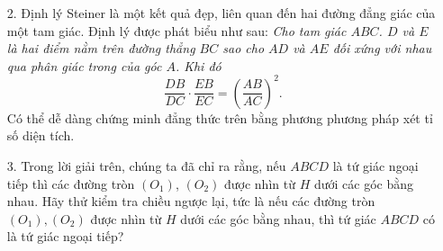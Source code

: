 \begin{bt}
{\begin{nx}
\begin{itemize}
\item [2.] Định lý Steiner là một kết quả đẹp, liên quan đến hai đường đẳng giác của một tam giác. Định lý được phát biểu như sau:
{\em{Cho tam giác $ABC$. $D$ và $E$ là hai điểm nằm trên đường thẳng $BC$ sao cho $AD$ và $AE$ đối xứng với nhau qua phân giác trong của góc $A$. Khi đó
$$\dfrac{DB}{DC}\cdot \dfrac{EB}{EC}=\left( \dfrac{AB}{AC}\right)^2.$$}}
Có thể dễ dàng chứng minh đẳng thức trên bằng phương phương pháp xét tỉ số diện tích.
\item [3.] Trong lời giải trên, chúng ta đã chỉ ra rằng, nếu $ABCD$ là tứ giác ngoại tiếp thì các đường tròn $(O_1)$, $(O_2)$ được nhìn từ $H$ dưới các góc bằng nhau. Hãy thử kiểm tra chiều ngược lại, tức là nếu các đường tròn $(O_1), (O_2)$ được nhìn từ $H$  dưới các góc bằng nhau, thì tứ giác $ABCD$ có là tứ giác ngoại tiếp?
\end{itemize}
\end{nx}
}
\end{bt}
